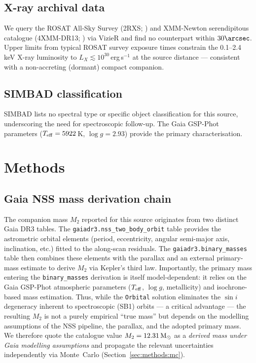 \documentclass[usenatbib,fleqn]{mnras}
\newcommand{\Msun}{{\rm M}_\odot}
\begin{document}
\subsection{X-ray archival data}
\label{sec:data:xray}

We query the ROSAT All-Sky Survey (2RXS; \citealt{Boller2016}) and
XMM-Newton serendipitous catalogue (4XMM-DR13;
\citealt{Webb2020}) via VizieR and find no counterpart within
$30\arcsec$.  Upper limits from typical ROSAT survey exposure times
constrain the 0.1--2.4\,keV X-ray luminosity to
$L_X \lesssim 10^{30}$\,erg\,s$^{-1}$ at the source distance ---
consistent with a non-accreting (dormant) compact companion.

\subsection{SIMBAD classification}
\label{sec:data:simbad}

SIMBAD \citep{Wenger2000} lists no spectral type or specific
object classification for this source, underscoring the need for
spectroscopic follow-up.  The Gaia GSP-Phot parameters
($T_{\rm eff} = 5922$\,K, $\log g = 2.93$) provide the primary
characterisation.

\section{Methods}
\label{sec:methods}

\subsection{Gaia NSS mass derivation chain}
\label{sec:methods:nss}

The companion mass $M_2$ reported for this source originates from
two distinct Gaia DR3 tables.  The \texttt{gaiadr3.nss\_two\_body\_orbit}
table provides the astrometric orbital elements (period, eccentricity,
angular semi-major axis, inclination, etc.) fitted to the along-scan
residuals.  The \texttt{gaiadr3.binary\_masses} table then combines these
elements with the parallax and an external primary-mass estimate to
derive $M_2$ via Kepler's third law.  Importantly, the primary mass
entering the \texttt{binary\_masses} derivation is itself
model-dependent: it relies on the Gaia GSP-Phot atmospheric parameters
($T_{\rm eff}$, $\log g$, metallicity) and isochrone-based mass
estimation.  Thus, while the \texttt{Orbital} solution eliminates the
$\sin i$ degeneracy inherent to spectroscopic (SB1) orbits --- a
critical advantage --- the resulting $M_2$ is not a purely empirical
``true mass'' but depends on the modelling assumptions of the NSS
pipeline, the parallax, and the adopted primary mass.  We therefore
quote the catalogue value $M_2 = 12.31\,\Msun$ as a {\em derived
mass under Gaia modelling assumptions} and propagate the relevant
uncertainties independently via Monte~Carlo
(Section~\ref{sec:methods:mc}).
\end{document}

